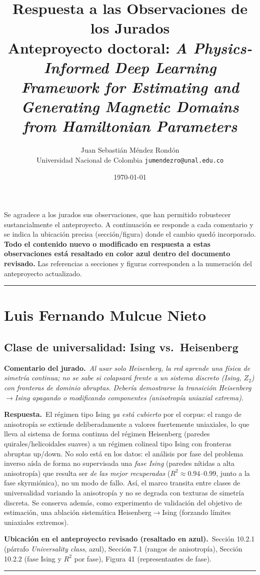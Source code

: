 \documentclass[11pt]{article}
\title{\vspace{-1.2cm}\color{jazul}\bfseries Respuesta a las Observaciones de los Jurados\\[2pt]
\large\normalfont Anteproyecto doctoral: \emph{A Physics-Informed Deep Learning Framework for Estimating and Generating Magnetic Domains from Hamiltonian Parameters}}
\author{Juan Sebastián Méndez Rondón \\ \small Universidad Nacional de Colombia \quad\textbullet\quad \texttt{jumendezro@unal.edu.co}}
\date{\today}
\newcommand{\comentario}[1]{\par\smallskip\noindent\textbf{\color{jgris}Comentario del jurado.}\ \textit{#1}\par}
\newcommand{\respuesta}[1]{\par\smallskip\noindent\textbf{\color{jverde}Respuesta.}\ #1\par}
\newcommand{\ubic}[1]{\par\smallskip\noindent\textbf{\color{jazul}Ubicación en el anteproyecto revisado (resaltado en azul).}\ #1\par\medskip\hrule\medskip}
\begin{document}
\maketitle

\noindent
Se agradece a los jurados sus observaciones, que han permitido robustecer sustancialmente el anteproyecto. A continuación se responde a cada comentario y se indica la ubicación precisa (sección/figura) donde el cambio quedó incorporado. \textbf{Todo el contenido nuevo o modificado en respuesta a estas observaciones está resaltado en color azul dentro del documento revisado.} Las referencias a secciones y figuras corresponden a la numeración del anteproyecto actualizado.

\bigskip\hrule\medskip

\section{Luis Fernando Mulcue Nieto}

\subsection{Clase de universalidad: Ising vs.\ Heisenberg}
\comentario{Al usar solo Heisenberg, la red aprende una física de simetría continua; no se sabe si colapsará frente a un sistema discreto (Ising, $Z_2$) con fronteras de dominio abruptas. Debería demostrarse la transición Heisenberg$\to$Ising apagando o modificando componentes (anisotropía uniaxial extrema).}
\respuesta{El régimen tipo Ising \emph{ya está cubierto} por el corpus: el rango de anisotropía se extiende deliberadamente a valores fuertemente uniaxiales, lo que lleva al sistema de forma continua del régimen Heisenberg (paredes quirales/helicoidales suaves) a un régimen colineal tipo Ising con fronteras abruptas up/down. No solo está en los datos: el análisis por fase del problema inverso aísla de forma no supervisada una \emph{fase Ising} (paredes nítidas a alta anisotropía) que resulta ser \emph{de las mejor recuperadas} ($R^2\approx0.94$--$0.99$, junto a la fase skyrmiónica), no un modo de fallo. Así, el marco transita entre clases de universalidad variando la anisotropía y no se degrada con texturas de simetría discreta. Se conserva además, como experimento de validación del objetivo de estimación, una ablación sistemática Heisenberg$\to$Ising (forzando límites uniaxiales extremos).}
\ubic{Sección 10.2.1 (párrafo \emph{Universality class}, azul), Sección 7.1 (rangos de anisotropía), Sección 10.2.2 (fase Ising y $R^2$ por fase), Figura 41 (representantes de fase).}
\end{document}
